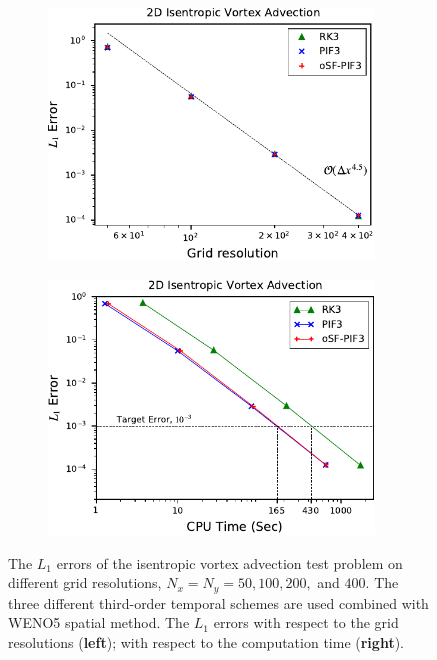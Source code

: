 \begin{figure}
    \centering
    \begin{subfigure}{70mm}
        \centering
        \includegraphics[width=0.95\textwidth]{fig/vortex_third}
    \end{subfigure}
    \begin{subfigure}{70mm}
        \centering
        \includegraphics[width=0.95\textwidth]{fig/vortex_time_third}
    \end{subfigure}
    \caption{The \( L_{1} \) errors of the isentropic vortex advection test problem
        on different grid resolutions, \( N_{x} = N_{y} = 50, 100, 200, \) and \( 400 \).
        The three different third-order temporal schemes
        are used combined with WENO5 spatial method.
        The \( L_{1} \) errors
        with respect to the grid resolutions (\textbf{left});
        with respect to the computation time (\textbf{right}).
    }\label{fig:vortex_third}
\end{figure}

